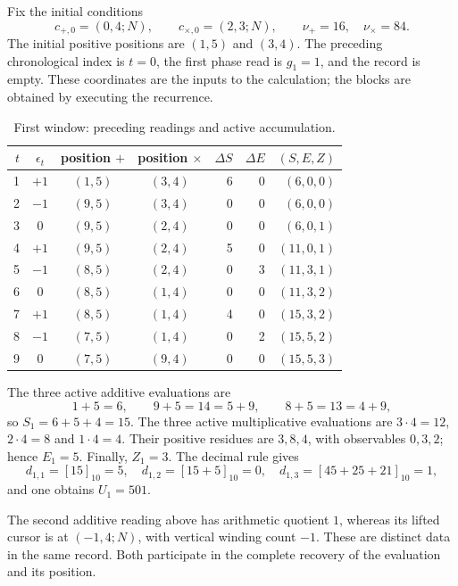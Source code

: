 Fix the initial conditions
\[
 c_{+,0}=(0,4;N),\qquad c_{\times,0}=(2,3;N),
 \qquad \nu_+=16,\quad\nu_\times=84.
\]
The initial positive positions are \((1,5)\) and \((3,4)\). The preceding
chronological index is \(t=0\), the first phase read is \(g_1=1\), and
the record is empty. These coordinates are the inputs to the calculation;
the blocks are obtained by executing the recurrence.

\begin{table}[htbp]
\caption{First window: preceding readings and active accumulation.}
\label{act21:tpk:tabla-501}
\small
\begin{tabular}{@{}rcccrrr@{}}
\toprule
\(t\)&\(\epsilon_t\)&position \(+\)&position \(\times\)&
\(\Delta S\)&\(\Delta E\)&\((S,E,Z)\)\\
\midrule
1&\(+1\)&\((1,5)\)&\((3,4)\)&6&0&\((6,0,0)\)\\
2&\(-1\)&\((9,5)\)&\((3,4)\)&0&0&\((6,0,0)\)\\
3&0&\((9,5)\)&\((2,4)\)&0&0&\((6,0,1)\)\\
4&\(+1\)&\((9,5)\)&\((2,4)\)&5&0&\((11,0,1)\)\\
5&\(-1\)&\((8,5)\)&\((2,4)\)&0&3&\((11,3,1)\)\\
6&0&\((8,5)\)&\((1,4)\)&0&0&\((11,3,2)\)\\
7&\(+1\)&\((8,5)\)&\((1,4)\)&4&0&\((15,3,2)\)\\
8&\(-1\)&\((7,5)\)&\((1,4)\)&0&2&\((15,5,2)\)\\
9&0&\((7,5)\)&\((9,4)\)&0&0&\((15,5,3)\)\\
\bottomrule
\end{tabular}
\par\smallskip{}
\end{table}

The three active additive evaluations are
\[
 1+5=6,\qquad9+5=14=5+9,\qquad8+5=13=4+9,
\]
so \(S_1=6+5+4=15\). The three active multiplicative evaluations are
\(3\cdot4=12\), \(2\cdot4=8\) and \(1\cdot4=4\). Their positive
residues are \(3,8,4\), with observables \(0,3,2\); hence \(E_1=5\).
Finally, \(Z_1=3\). The decimal rule gives
\[
 d_{1,1}=[15]_{10}=5,\quad
 d_{1,2}=[15+5]_{10}=0,\quad
 d_{1,3}=[45+25+21]_{10}=1,
\]
and one obtains \(U_1=501\).

The second additive reading above has arithmetic quotient \(1\), whereas
its lifted cursor is at \((-1,4;N)\), with vertical winding count \(-1\).
These are distinct data in the same record. Both participate in the
complete recovery of the evaluation and its position.

